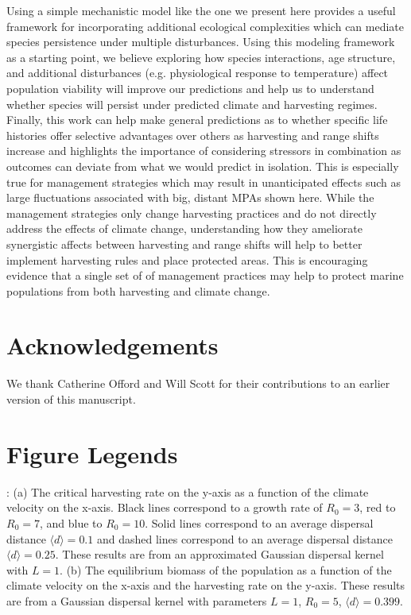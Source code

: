 \documentclass[12pt,english]{article}
\begin{document}
\begin{spacing}{1.9}
\begin{flushleft}
Using a simple mechanistic model like the one we present here provides a useful framework for incorporating additional ecological complexities which can mediate species persistence under multiple disturbances. Using this modeling framework as a starting point, we believe exploring how species interactions, age structure, and additional disturbances (e.g. physiological response to temperature) affect population viability will improve our predictions and help us to understand whether species will persist under predicted climate and harvesting regimes. Finally, this work can help make general predictions as to whether specific life histories offer selective advantages over others as harvesting and range shifts increase and highlights the importance of considering stressors in combination as outcomes can deviate from what we would predict in isolation. This is especially true for management strategies which may result in unanticipated effects such as large fluctuations associated with big, distant MPAs shown here. While the management strategies only change harvesting practices and do not directly address the effects of climate change, understanding how they ameliorate synergistic affects between harvesting and range shifts will help to better implement harvesting rules and place protected areas.  This is encouraging evidence that a single set of of management practices may help to protect marine populations from both harvesting and climate change.

\section*{ Acknowledgements}
We thank Catherine Offord and Will Scott for their contributions to an earlier version of this manuscript. 

\end{flushleft}



\pagebreak

\section*{Figure Legends}

: (a) The critical harvesting rate on the y-axis as a function of the climate velocity on the x-axis.  Black lines correspond to a growth rate of $R_0=3$, red to $R_0=7$, and blue to $R_0=10$.  Solid lines correspond to an average dispersal distance $\langle d \rangle =0.1$ and dashed lines correspond to an average dispersal distance $\langle d \rangle =0.25$.  These results are from an approximated Gaussian dispersal kernel with $L=1$.  (b) 
The equilibrium biomass of the population as a function of the climate velocity on the x-axis and the harvesting rate on the y-axis. These results are from a Gaussian dispersal kernel with parameters $L=1$, $R_0=5$, $\langle d \rangle = 0.399$. 
\hspace{6in}
\hspace{6in}


\end{spacing}
\end{document}

